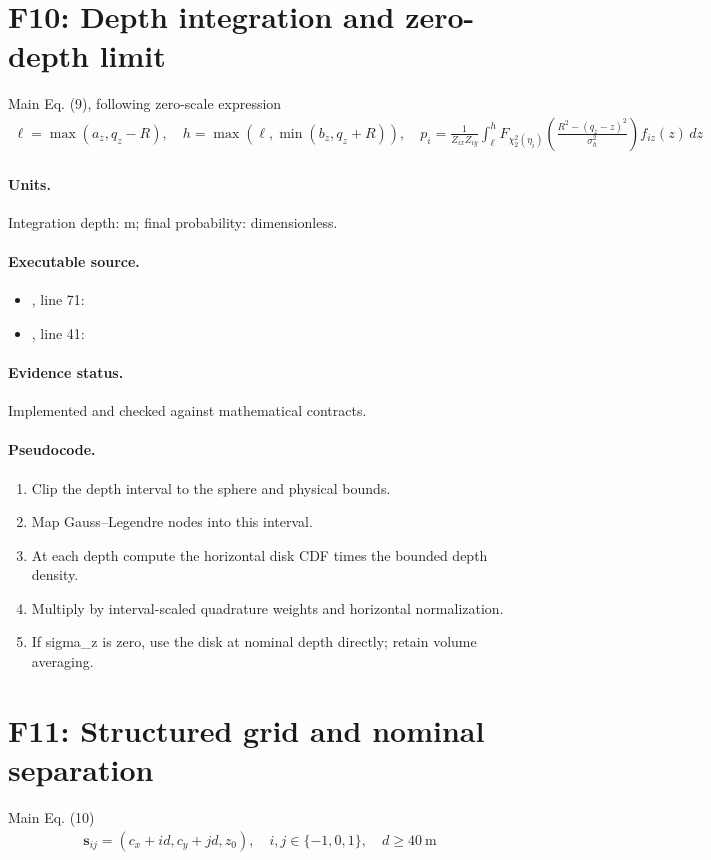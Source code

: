 \documentclass[10pt]{article}
\begin{document}
\section*{F10: Depth integration and zero-depth limit}
Main Eq. (9), following zero-scale expression
\begin{gather*}\ell=\max(a_z,q_z-R),\quad h=\max(\ell,\min(b_z,q_z+R)),\quad p_i=\frac1{Z_{ix}Z_{iy}}\int_\ell^h F_{\chi^2_2(\eta_i)}\!\left(\frac{R^2-(q_z-z)^2}{\sigma_h^2}\right)f_{iz}(z)\,dz\end{gather*}
\paragraph{Units.} Integration depth: m; final probability: dimensionless.
\paragraph{Executable source.}
\begin{itemize}[leftmargin=*]
\item {}, line 71: 
\item {}, line 41: 
\end{itemize}
\paragraph{Evidence status.} Implemented and checked against mathematical contracts.
\paragraph{Pseudocode.}
\begin{enumerate}[leftmargin=*]
\item Clip the depth interval to the sphere and physical bounds.
\item Map Gauss--Legendre nodes into this interval.
\item At each depth compute the horizontal disk CDF times the bounded depth density.
\item Multiply by interval-scaled quadrature weights and horizontal normalization.
\item If sigma\_z is zero, use the disk at nominal depth directly; retain volume averaging.
\end{enumerate}
\newpage
\section*{F11: Structured grid and nominal separation}
Main Eq. (10)
\begin{gather*}\mathbf s_{ij}=(c_x+id,c_y+jd,z_0),\quad i,j\in\{-1,0,1\},\quad d\ge40\ \mathrm m\end{gather*}
\end{document}
